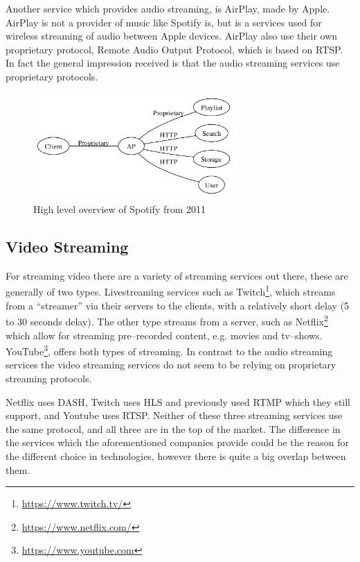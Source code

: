 Another service which provides audio streaming, is AirPlay, made by Apple. 
AirPlay is not a provider of music like Spotify is, but is a services used for wireless streaming of audio between Apple devices.
AirPlay also use their own proprietary protocol, Remote Audio Output Protocol, which is based on \ac{RTSP}.
In fact the general impression received is that the audio streaming services use proprietary protocols.

\begin{figure}[!bht]
    \centering
    \includegraphics[width=0.7\textwidth]{img/spotifyOverview.png}
    \caption{High level overview of Spotify from 2011 \cite{spotifySlides}}
    \label{fig:spotifyOverview}
\end{figure}


\subsection{Video Streaming}
For streaming video there are a variety of streaming services out there, these are generally of two types.
Livestreaming services such as Twitch\footnote{\url{https://www.twitch.tv/}}, which streams from a ``streamer'' via their servers to the clients, with a relatively short delay (5 to 30 seconds delay). 
The other type streams from a server, such as Netflix\footnote{\url{https://www.netflix.com/}} which allow for streaming pre--recorded content, e.g. movies and tv--shows.
YouTube\footnote{\url{https://www.youtube.com}}, offers both types of streaming.
In contrast to the audio streaming services the video streaming services do not seem to be relying on proprietary streaming protocols.

Netflix uses \ac{DASH}, Twitch uses \ac{HLS} and previously used \ac{RTMP} which they still support, and Youtube uses \ac{RTSP}.\cite{netflix}\cite{twitch}\cite{youtube}
Neither of these three streaming services use the same protocol, and all three are in the top of the market.
The difference in the services which the aforementioned companies provide could be the reason for the different choice in technologies, however there is quite a big overlap between them. 


